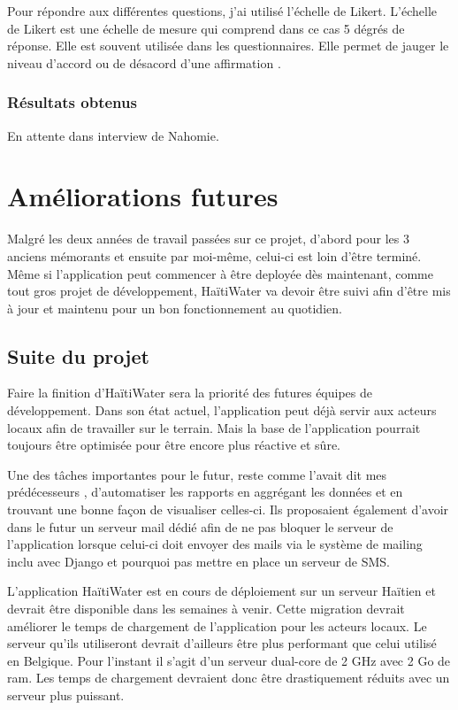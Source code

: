 \documentclass{EPL-master-thesis-covers-FR}
\begin{document}
				Pour répondre aux différentes questions, j'ai utilisé l'échelle de Likert. L'échelle de Likert est une échelle de mesure qui comprend dans ce cas 5 dégrés de réponse. Elle est souvent utilisée dans les questionnaires. Elle permet de jauger le niveau d'accord ou de désacord d'une affirmation \cite{ref:likert}.
				
	
			\subsection*{Résultats obtenus}
				En attente dans interview de Nahomie.
				


	\chapter{Améliorations futures}
		Malgré les deux années de travail passées sur ce projet, d'abord pour les 3 anciens mémorants \cite{ref:haitiwater} et ensuite par moi-même, celui-ci est loin d'être terminé. Même si l'application peut commencer à être deployée dès maintenant, comme tout gros projet de développement, HaïtiWater va devoir être suivi afin d'être mis à jour et maintenu pour un bon fonctionnement au quotidien. 

		\section{Suite du projet}
			\label{ref:suite_projet}
			Faire la finition d'HaïtiWater sera la priorité des futures équipes de développement. Dans son état actuel, l'application peut déjà servir aux acteurs locaux afin de travailler sur le terrain. Mais la base de l'application pourrait toujours être optimisée pour être encore plus réactive et sûre.		
			
			Une des tâches importantes pour le futur, reste comme l'avait dit mes prédécesseurs \cite{ref:haitiwater}, d'automatiser les rapports en aggrégant les données et en trouvant une bonne façon de visualiser celles-ci. Ils proposaient également d'avoir dans le futur un serveur mail dédié afin de ne pas bloquer le serveur de l'application lorsque celui-ci doit envoyer des mails via le système de mailing inclu avec Django et pourquoi pas mettre en place un serveur de SMS.
			
			L'application HaïtiWater est en cours de déploiement sur un serveur Haïtien et devrait être disponible dans les semaines à venir. Cette migration devrait améliorer le temps de chargement de l'application pour les acteurs locaux. Le serveur qu'ils utiliseront devrait d'ailleurs être plus performant que celui utilisé en Belgique. Pour l'instant il s'agit d'un serveur dual-core de 2 GHz avec 2 Go de ram. Les temps de chargement devraient donc être drastiquement réduits avec un serveur plus puissant. 
			
\end{document}
